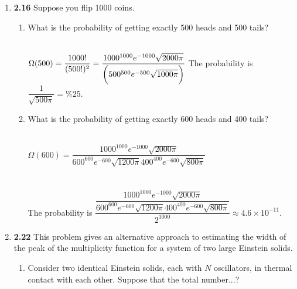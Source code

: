 \documentclass[fleqn]{article}
\begin{document}
\begin{enumerate}
    \item \textbf{2.16} Suppose you flip 1000 coins.
    \begin{enumerate}
      \item What is the probability of getting exactly 500 heads and 500 tails?

        \textcolor{hwColor}{
          \\
          $
            \Omega(500)=\dfrac{1000!}{(500!)^2}
            =\dfrac{
              1000^{1000} e^{-1000} \sqrt{2000 \pi} 
              }{
                \bigg( 500^{500} e^{-500} \sqrt{1000 \pi} \bigg)
              }
            \\
            \\
          $
          The probability is $\dfrac{1}{\sqrt{500 \pi}}=\%25$.
          \\
        }

      \item What is the probability of getting exactly 600 heads and 400 tails?

        \textcolor{hwColor}{
          \\
          $
            \Omega(600)=\dfrac{
              1000^{1000} e^{-1000} \sqrt{2000 \pi}
            }{
              600^{600} e^{-600} \sqrt{1200 \pi} 400^{400} e^{-600} \sqrt{800 \pi}
            }
          $
          \\
          \\
          \\
          The probability is 
          $
            \dfrac{
              \dfrac{
                1000^{1000} e^{-1000} \sqrt{2000 \pi}
              }{
                600^{600} e^{-600} \sqrt{1200 \pi} 400^{400} e^{-600} \sqrt{800 \pi}
              }
            }{
              2^{1000}
            }
            \approx 4.6 \times 10^{-11}
          $.
          \\
        }

    \end{enumerate}

    \item \textbf{2.22} This problem gives an alternative approach to estimating the width of the peak of the multiplicity 
    function for a system of two large Einstein solids.
    \begin{enumerate}
      \item Consider two identical Einstein solids, each with $N$ oscillators, in thermal contact with each other. Suppose
      that the total number...?


\end{enumerate}
\end{enumerate}
\end{document}
